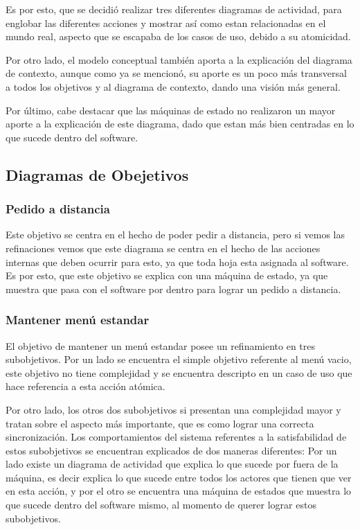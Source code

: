 \documentclass[a4paper,10pt]{article}
\begin{document}
Es por esto, que se decidi\'o realizar tres diferentes diagramas de actividad, para englobar las diferentes acciones y mostrar as\'i como 
estan relacionadas en el mundo real, aspecto que se escapaba de los casos de uso, debido a su atomicidad.



Por otro lado, el modelo conceptual tambi\'en aporta a la explicaci\'on del diagrama de contexto, aunque como ya se mencion\'o, su aporte
es un poco m\'as transversal a todos los objetivos y al diagrama de contexto, dando una visi\'on m\'as general.


Por \'ultimo, cabe destacar que las m\'aquinas de estado no realizaron un mayor aporte a la explicaci\'on de este diagrama, dado que estan m\'as bien
centradas en lo que sucede dentro del software.

\subsection*{Diagramas de Obejetivos}

\subsubsection*{Pedido a distancia}

Este objetivo se centra en el hecho de poder pedir a distancia, pero si vemos las refinaciones vemos que este diagrama se centra en el hecho de las acciones internas que deben ocurrir para esto, ya que toda hoja esta asignada al software. Es por esto, que este objetivo se explica con una m\'aquina de estado, ya que muestra que pasa con el software por dentro para lograr un pedido a distancia.

 
\subsubsection*{Mantener men\'u estandar}

El objetivo de mantener un men\'u estandar posee un refinamiento en tres subobjetivos. Por un lado se encuentra el simple objetivo referente
al men\'u vacio, este objetivo no tiene complejidad y se encuentra descripto en un caso de uso que hace referencia a esta acci\'on at\'omica.

Por otro lado, los otros dos subobjetivos si presentan una complejidad mayor y tratan sobre el aspecto m\'as importante, que es como lograr una 
correcta sincronizaci\'on. Los comportamientos del sistema referentes a la satisfabilidad de estos subobjetivos se encuentran explicados de dos maneras
diferentes: Por un lado existe un diagrama de actividad que explica lo que sucede por fuera de la m\'aquina, es decir explica lo que sucede entre todos
los actores que tienen que ver en esta acci\'on, y por el otro se encuentra una m\'aquina de estados que muestra lo que sucede dentro del software
mismo, al momento de querer lograr estos subobjetivos.
\end{document}
